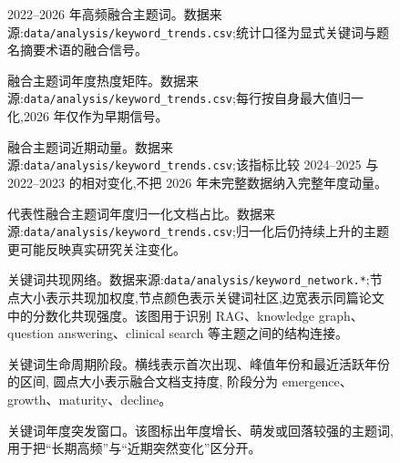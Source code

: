 \begin{figure}[H]
  \centering
  \caption{2022--2026 年高频融合主题词。数据来源:\texttt{data/analysis/keyword\_trends.csv};统计口径为显式关键词与题名摘要术语的融合信号。}
  \label{fig:top-keywords}
\end{figure}

\begin{figure}[!htbp]
  \centering
  \caption{融合主题词年度热度矩阵。数据来源:\texttt{data/analysis/keyword\_trends.csv};每行按自身最大值归一化,2026 年仅作为早期信号。}
  \label{fig:keyword-heatmap}
\end{figure}

\begin{figure}[!htbp]
  \centering
  \caption{融合主题词近期动量。数据来源:\texttt{data/analysis/keyword\_trends.csv};该指标比较 2024--2025 与 2022--2023 的相对变化,不把 2026 年未完整数据纳入完整年度动量。}
  \label{fig:keyword-momentum}
\end{figure}

\begin{figure}[!htbp]
  \centering
  \caption{代表性融合主题词年度归一化文档占比。数据来源:\texttt{data/analysis/keyword\_trends.csv};归一化后仍持续上升的主题更可能反映真实研究关注变化。}
  \label{fig:keyword-trends}
\end{figure}

\begin{figure}[!htbp]
  \centering
  \caption{关键词共现网络。数据来源:\texttt{data/analysis/keyword\_network.*};节点大小表示共现加权度,节点颜色表示关键词社区,边宽表示同篇论文中的分数化共现强度。该图用于识别 RAG、knowledge graph、question answering、clinical search 等主题之间的结构连接。}
  \label{fig:keyword-network}
\end{figure}

\begin{figure}[!htbp]
  \centering
  \caption{关键词生命周期阶段。横线表示首次出现、峰值年份和最近活跃年份的区间, 圆点大小表示融合文档支持度, 阶段分为 emergence、growth、maturity、decline。}
\end{figure}

\begin{figure}[!htbp]
  \centering
  \caption{关键词年度突发窗口。该图标出年度增长、萌发或回落较强的主题词, 用于把“长期高频”与“近期突然变化”区分开。}
\end{figure}

